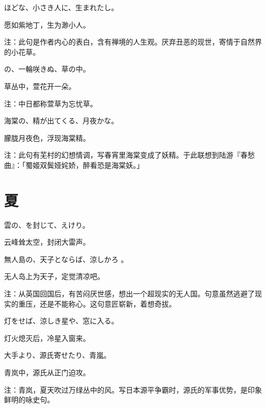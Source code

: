 \begin{haiku}
    {\FH {}ほどな、小さき人に、生まれたし。}

    {\FK 愿如紫地丁，生为渺小人。}

    {\FT 注：此句是作者内心的表白，含有禅境的人生观。厌弃丑恶的现世，寄情于自然界的小花草。}
\end{haiku}

\begin{haiku}
    {\FH {}の、一輪咲きぬ、草の中。}

    {\FK 草丛中，萱花开一朵。}

    {\FT 注：中日都称萱草为忘忧草。}
\end{haiku}

\begin{haiku}
    {\FH 海棠の、精が出てくる、月夜かな。}

    {\FK 朦胧月夜色，浮现海棠精。}

    {\FT 注：此句有芜村的幻想情调，写春宵里海棠变成了妖精。于此联想到陆游『春愁曲』：「蜀姬双鬓娅姹娇，醉看恐是海棠妖。」}
\end{haiku}

\section{\FK 夏}

\setcounter{haikucounter}{0}

\begin{haiku}
    {\FH 雲の、を封じて、えけり。}

    {\FK 云峰耸太空，封闭大雷声。}
\end{haiku}

\begin{haiku}
    {\FH 無人島の、天子とならば、涼しかろ
    。}

    {\FK 无人岛上为天子，定觉清凉吧。}

    {\FT 注：从英国回国后，有苦闷厌世感，想出一个超现实的无人国。句意虽然逃避了现实的重压，还是不能称心。这句意匠崭新，着想奇拔。}
\end{haiku}

\begin{haiku}
    {\FH 灯をせば、涼しき星や、窓に入る。}

    {\FK 灯火熄灭后，冷星入窗来。}
\end{haiku}

\begin{haiku}
    {\FH 大手より、源氏寄せたり、青嵐。}

    {\FK 青岚中，源氏从正门迫攻。}

    {\FT 注：青岚，夏天吹过万绿丛中的风。写日本源平争霸时，源氏的军事优势，是印象鲜明的咏史句。}
\end{haiku}

